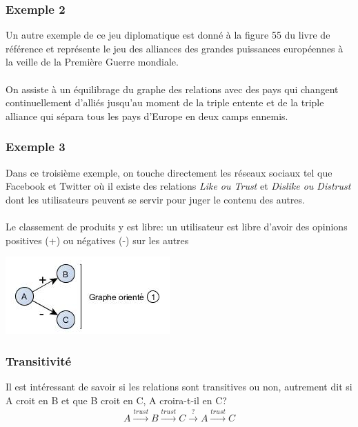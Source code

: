 \subsubsection*{Exemple 2}
Un autre exemple de ce jeu diplomatique est donné à la figure 55 du livre de référence et représente le jeu des alliances des grandes puissances européennes à la veille de la Première Guerre mondiale. 
\paragraph{}
 On assiste à un équilibrage du graphe des relations avec des pays qui changent continuellement d'alliés jusqu'au moment de la triple entente et de la triple alliance qui sépara tous les pays d'Europe en deux camps ennemis.

\subsubsection*{Exemple 3}
Dans ce troisième exemple, on touche directement les réseaux sociaux tel que Facebook et Twitter où il existe des relations \textit{Like ou Trust} et \textit{Dislike ou Distrust} dont les utilisateurs peuvent se servir pour juger le contenu des autres.
\paragraph{}
Le classement de produits y est libre: un utilisateur est libre d'avoir des opinions positives (+) ou négatives (-) sur les autres


\includegraphics[scale=1]{images/22_graphe-oriente.png}

\subsubsection*{Transitivité}  

Il est intéressant de savoir si les relations sont transitives ou non, autrement dit si A croit en B et que B croit en C, A croira-t-il en C?
\begin{align*}
A \overset{trust}{\longrightarrow} B \overset{trust}{\longrightarrow} C \overset{?}{\longrightarrow} A \overset{trust}{\longrightarrow} C
\end{align*}

